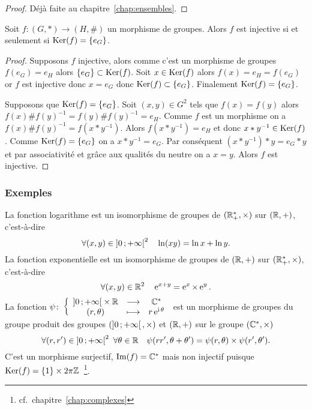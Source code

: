 \begin{proof}
  Déjà faite au chapitre~\ref{chap:ensembles}.
\end{proof}
\begin{prop}
  Soit $f:(G,*) \longrightarrow (H,\#)$ un morphisme de groupes. Alors $f$ est injective si et seulement si $\operatorname{Ker}(f)=\{e_G\}$.
\end{prop}
\begin{proof}
  Supposons $f$ injective, alors comme c'est un morphisme de groupes $f(e_G)=e_H$ alors $\{e_G\} \subset \operatorname{Ker}(f)$. Soit $x \in \operatorname{Ker}(f)$ alors $f(x)=e_H=f(e_G)$ or $f$ est injective donc $x=e_G$ donc $\operatorname{Ker}(f) \subset \{e_G\}$. Finalement $\operatorname{Ker}(f)=\{e_G\}$.

Supposons que $\operatorname{Ker}(f)=\{e_G\}$. Soit $(x,y) \in G^2$ tels que $f(x)=f(y)$ alors $f(x)\#f(y)^{-1}=f(y)\#f(y)^{-1} = e_H$. Comme $f$ est un morphisme on a $f(x)\#f(y)^{-1} = f(x*y^{-1})$. Alors $f(x*y^{-1}) = e_H$ et donc $x*y^{-1} \in \operatorname{Ker}(f)$. Comme $\operatorname{Ker}(f)=\{e_G\}$ on a $x*y^{-1} = e_G$. Par conséquent $(x*y^{-1})*y = e_G*y$ et par associativité et grâce aux qualités du neutre on a $x=y$. Alors $f$ est injective.
\end{proof}

\subsubsection{Exemples}

La fonction logarithme est un isomorphisme de groupes de $(\mathbb{R}^{*}_+,\times)$ sur $(\mathbb{R},+)$, c'est-à-dire
\begin{equation}
  \forall (x,y) \in \left] 0 \, ;  +\infty \right[^2 \quad \ln(xy) = \ln x + \ln y.
\end{equation}
La fonction exponentielle est un isomorphisme de groupes de $(\mathbb{R},+)$ sur $(\mathbb{R}^{*}_+,\times)$, c'est-à-dire
\begin{equation}
  \forall (x,y) \in \mathbb{R}^2 \quad \operatorname{e}^{x+y} = \operatorname{e}^x \times \operatorname{e}^y.
\end{equation}
La fonction $\psi\colon \left\{\begin{array}{ccc} \left] 0 \, ;  +\infty \right[ \times \mathbb{R} & \longrightarrow &\mathbb{C}^{*}\\ (r,\theta) & \longmapsto & r\operatorname{e}^{\operatorname{i} \theta} \end{array} \right.$ est un morphisme de groupes du groupe produit des groupes $(\left] 0 \, ;  +\infty \right[,\times)$ et $(\mathbb{R},+)$ sur le groupe $(\mathbb{C}^{*},\times)$
\begin{equation}
  \forall (r,r') \in \left] 0 \, ;  +\infty \right[^2 \ \forall \theta \in \mathbb{R} \quad \psi(rr',\theta+\theta')=\psi(r,\theta) \times \psi(r',\theta').
\end{equation}
C'est un morphisme surjectif, $\operatorname{Im}(f)=\mathbb{C}^{*}$ mais non injectif puisque $\operatorname{Ker}(f)=\{1\}\times 2\pi \mathbb{Z}$~\footnote{cf.\ chapitre~\ref{chap:complexes}}.

